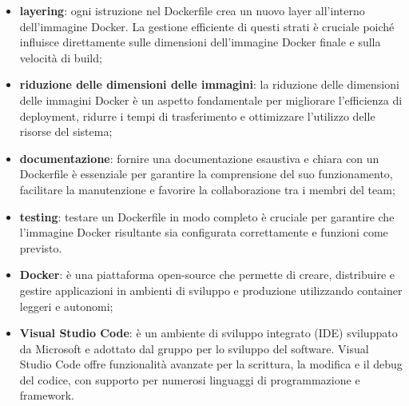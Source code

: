 \begin{itemize}
	\item \textbf{layering}: ogni istruzione nel Dockerfile crea un nuovo layer all'interno dell'immagine Docker. La gestione efficiente di questi strati è cruciale poiché influisce direttamente sulle dimensioni dell'immagine Docker finale e sulla velocità di build;
	\item \textbf{riduzione delle dimensioni delle immagini}: la riduzione delle dimensioni delle immagini Docker è un aspetto fondamentale per migliorare l'efficienza di deployment, ridurre i tempi di trasferimento e ottimizzare l'utilizzo delle risorse del sistema;
	\item \textbf{documentazione}: fornire una documentazione esaustiva e chiara con un Dockerfile è essenziale per garantire la comprensione del suo funzionamento, facilitare la manutenzione e favorire la collaborazione tra i membri del team;
	\item \textbf{testing}: testare un Dockerfile in modo completo è cruciale per garantire che l'immagine Docker risultante sia configurata correttamente e funzioni come previsto. 
\end{itemize}

\begin{itemize}
	\item \textbf{Docker}: è una piattaforma open-source che permette di creare, distribuire e gestire applicazioni in ambienti di sviluppo e produzione utilizzando container leggeri e autonomi;
	\item \textbf{Visual Studio Code}: è un ambiente di sviluppo integrato (IDE) sviluppato da Microsoft e adottato dal gruppo per lo sviluppo del software. Visual Studio Code offre funzionalità avanzate per la scrittura, la modifica e il debug del codice, con supporto per numerosi linguaggi di programmazione e framework.
\end{itemize}

